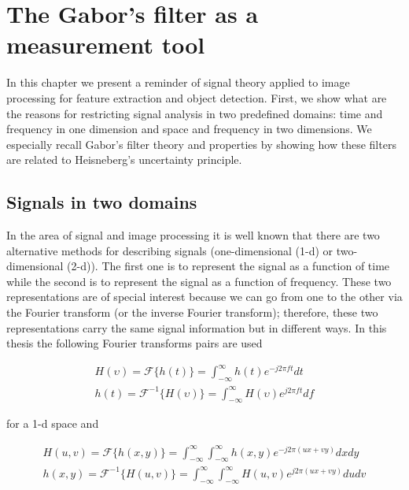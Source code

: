 
\chapter{The Gabor's filter as a measurement tool}

In this chapter we present a reminder of signal theory applied to image processing for feature extraction and object detection. First, we show what are the reasons for restricting signal analysis in two predefined domains: time and frequency in one dimension and space and frequency in two dimensions. We especially recall Gabor's filter theory and properties by showing how these filters are related to Heisneberg's uncertainty principle.

\section{Signals in two domains}

In the area of signal and image processing it is well known that there are two alternative methods for describing signals (one-dimensional (1-d) or two-dimensional (2-d)). The first one is to represent the signal as a function of time while the second is to represent the signal as a function of frequency. These two representations are of special interest because we can go from one to the other via the Fourier transform (or the inverse Fourier transform); therefore, these two representations carry the same signal information but in different ways. In this thesis the following Fourier transforms pairs are used

\begin{equation}\label{eq:fourier_transforms_1d}
    \begin{gathered}
        H(\upsilon) = \mathcal{F}\{h(t)\} = \int_{-\infty}^{\infty} h(t) e^{-j2\pi f t} dt \\
        h(t) = \mathcal{F}^{-1}\{H(\upsilon)\} = \int_{-\infty}^{\infty} H(\upsilon) e^{j2\pi f t} df 
    \end{gathered}
\end{equation}

for a 1-d space and 

\begin{equation}\label{eq:fourier_transforms_2d}
    \begin{gathered}
        H(u, v) = \mathcal{F}\{h(x, y)\} = \int_{-\infty}^{\infty} \int_{-\infty}^{\infty} h(x, y) e^{-j2\pi (ux + vy)} dx dy \\
        h(x, y) = \mathcal{F}^{-1}\{H(u, v)\} = \int_{-\infty}^{\infty} \int_{-\infty}^{\infty}  H(u, v) e^{j2\pi (ux + vy)} du dv 
    \end{gathered}
\end{equation}

